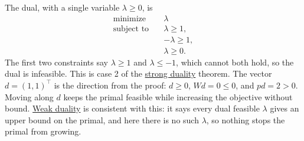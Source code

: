 \begin{example}
		The dual, with a single variable $\lambda \geq 0$, is 
		\begin{align}
			\text{minimize} \quad &\lambda \\
			\text{subject to} \quad &\lambda \geq 1, \\
			&-\lambda \geq 1, \\
			&\lambda \geq 0.
		\end{align}
		The first two constraints say $\lambda \geq 1$ and $\lambda \leq -1$, which cannot both hold, so the dual is infeasible. This is case 2 of the \hyperref[thm:strong-duality]{strong duality} theorem. The vector $d = (1, 1)^\top$ is the direction from the proof: $d \geq 0$, $Wd = 0 \leq 0$, and $pd = 2 > 0$. Moving along $d$ keeps the primal feasible while increasing the objective without bound. \hyperref[thm:weak-duality]{Weak duality} is consistent with this: it says every dual feasible $\lambda$ gives an upper bound on the primal, and here there is no such $\lambda$, so nothing stops the primal from growing. 
	\end{example}

